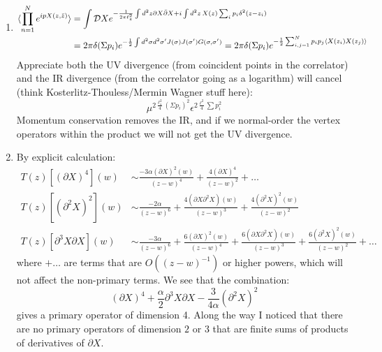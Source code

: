 \documentclass[11pt]{article}
\begin{document}
\begin{enumerate}
	
	\item 
	\[
	\begin{aligned}
		\braket{\prod_{n=1}^N e^{i p X(z, \bar z)}} &= \int \mathcal DX e^{-\frac{1}{2\pi \ell_s^2} \int d^2 z \partial X \bar \partial X + i \int d^2 z \, X(z)  \sum_i p_i \delta^2(z-z_i)}\\ &= 2 \pi \delta(\Sigma p_i) e^{-\frac12 \int d^2 \sigma d^2 \sigma' J(\sigma) J(\sigma') G(\sigma, \sigma')} = 2 \pi \delta(\Sigma p_i) e^{-\frac12 \sum_{i,j=1}^N p_i p_j \braket{X(z_i) X(z_j)}}
	\end{aligned}
	\]
	Appreciate both the UV divergence (from coincident points in the correlator) and the IR divergence (from the correlator going as a logarithm) will cancel (think Kosterlitz-Thouless/Mermin Wagner stuff here):
	\[
		\mu^{2 \frac{\ell^2_s}{4} (\Sigma p_i)^2} \epsilon^{2 \frac{\ell^2}{4} \sum p_i^2}
	\]
	Momentum conservation removes the IR, and if we normal-order the vertex operators within the product we will not get the UV divergence.
	
	\item By explicit calculation:
	\[
	\begin{aligned}
		T(z) [(\partial X)^4](w) &\sim \frac{-3 \alpha (\partial X)^2(w)}{(z-w)^4} + \frac{4 (\partial X)^4}{(z-w)^2} + \dots \\
		T(z) [(\partial^2 X)^2](w) &\sim \frac{-2 \alpha}{(z-w)^6} + \frac{4 (\partial X \partial^2 X)(w)}{(z-w)^3} + \frac{4 (\partial^2 X)^2 (w)}{(z-w)^2}\\
		T(z) [\partial^3 X \partial X](w) &\sim \frac{-3 \alpha}{(z-w)^6} + \frac{6 (\partial X)^2 (w)}{(z-w)^4} + \frac{6 (\partial X \partial^2 X)(w)}{(z-w)^3} + \frac{6 (\partial^2 X)^2 (w)}{(z-w)^2} + \dots
	\end{aligned}
	\]
	where $+ \dots$ are terms that are $O((z-w)^{-1})$ or higher powers, which will not affect the non-primary terms. We see that the combination:
	\[
		(\partial X)^4 + \frac{\alpha}{2}  \partial^3 X \partial X - \frac{3}{4\alpha} (\partial^2 X)^2
	\]
	gives a primary operator of dimension 4. Along the way I noticed that there are no primary operators of dimension $2$ or $3$ that are finite sums of products of derivatives of $\partial X$.
	

\end{enumerate}
\end{document}
